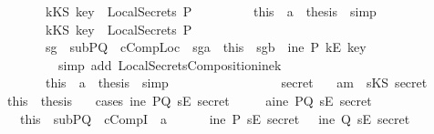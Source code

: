 \begin{isabellebody}
\ \ \ \ \ \ \ \ \isamarkupfalse \ {\isachardoublequoteopen}kKS\ key\ {\isasymin}\ LocalSecrets\ P{\isachardoublequoteclose}\isanewline
\ \ \ \ \ \ \ \ \isamarkupfalse \ this\ \ a{}\ \isamarkupfalse \ {\isacharquery}thesis\ \isamarkupfalse \ simp\isanewline
\ \ \ \ \ \ \isamarkupfalse \isanewline
\ \ \ \ \ \ \ \ \isamarkupfalse \ {\isachardoublequoteopen}kKS\ key\ {\isasymnotin}\ LocalSecrets\ P{\isachardoublequoteclose}\isanewline
\ \ \ \ \ \ \ \ \isamarkupfalse \ sg{}\ \ subPQ\ \ cCompLoc\ \ sg{}a\ \ this\ \ sg{}b\ \isamarkupfalse \ {\isachardoublequoteopen}ine\ P\ {\isacharparenleft}kE\ key{\isacharparenright}{\isachardoublequoteclose}\isanewline
\ \ \ \ \ \ \ \ \ \ \isamarkupfalse \ {\isacharparenleft}simp\ add{\isacharcolon}\ LocalSecretsComposition{\isacharunderscore}ine{}{\isacharunderscore}k{\isacharparenright}\isanewline
\ \ \ \ \ \ \ \ \isamarkupfalse \ this\ \ a{}\ \isamarkupfalse \ {\isacharquery}thesis\ \isamarkupfalse \ simp\isanewline
\ \ \ \ \ \ \isamarkupfalse \isanewline
\ \ \ \ \isamarkupfalse \isanewline
\ \ \isamarkupfalse \isanewline
{}\isamarkupfalse \isanewline
\ \ \isamarkupfalse \ secret\isanewline
\ \ \isamarkupfalse \ a{}{\isacharcolon}{\isachardoublequoteopen}m\ {\isacharequal}\ sKS\ secret{\isachardoublequoteclose}\isanewline
\ \ \isamarkupfalse \ this\ \isamarkupfalse \ {\isacharquery}thesis\isanewline
\ \ \isamarkupfalse \ {\isacharparenleft}cases\ {\isachardoublequoteopen}ine\ PQ\ {\isacharparenleft}sE\ secret{\isacharparenright}{\isachardoublequoteclose}{\isacharparenright}\isanewline
\ \ \ \ \isamarkupfalse \ a{}{}{\isacharcolon}{\isachardoublequoteopen}ine\ PQ\ {\isacharparenleft}sE\ secret{\isacharparenright}{\isachardoublequoteclose}\isanewline
\ \ \ \ \isamarkupfalse \ this\ \ subPQ\ \ cCompI\ \ a{}\ \isamarkupfalse \isanewline
\ \ \ \ \ {\isachardoublequoteopen}ine\ P\ {\isacharparenleft}sE\ secret{\isacharparenright}\ \ {\isasymor}\ ine\ Q\ {\isacharparenleft}sE\ secret{\isacharparenright}{\isachardoublequoteclose}\isanewline

\end{isabellebody}

